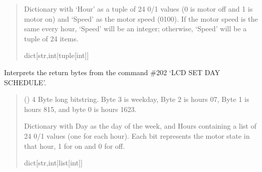 \documentclass[letterpaper,10pt,english]{sphinxmanual}
\begin{document}
\begin{fulllineitems}
\begin{fulllineitems}
\begin{quote}
\begin{description}
\sphinxAtStartPar
Dictionary with ‘Hour’ as a tuple of 24 0/1 values (0 is motor off and                 1 is motor on) and ‘Speed’ as the motor speed (0\sphinxhyphen{}100). If the motor speed is the same                 every hour, ‘Speed’ will be an integer; otherwise, ‘Speed’ will be a tuple of 24 items.

\sphinxAtStartPar
dict{[}str,int|tuple{[}int{]}{]}

\end{description}\end{quote}

\end{fulllineitems}


\begin{fulllineitems}
\label{\detokenize{PodApi.Devices:PodApi.Devices.PodDevice_8229.Pod8229.DecodeLCDSchedule}}
\pysigstartsignatures
{}
\pysigstopsignatures
\sphinxAtStartPar
Interprets the return bytes from the command \#202 ‘LCD SET DAY SCHEDULE’.
\begin{quote}\begin{description}
\sphinxAtStartPar
{} () \textendash{} 4 Byte long bitstring. Byte 3 is weekday, Byte 2 is hours 0\sphinxhyphen{}7,                 Byte 1 is hours 8\sphinxhyphen{}15, and byte 0 is hours 16\sphinxhyphen{}23.

\sphinxAtStartPar
Dictionary with Day as the day of the week, and Hours                 containing a list of 24 0/1 values (one for each hour). Each bit represents the                 motor state in that hour, 1 for on and 0 for off.

\sphinxAtStartPar
dict{[}str,int|list{[}int{]}{]}

\end{description}\end{quote}


\end{fulllineitems}
\end{fulllineitems}
\end{document}
